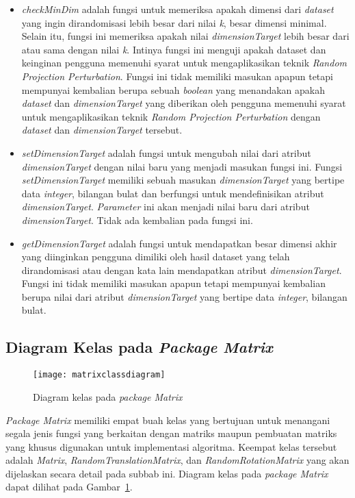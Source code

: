 \begin{itemize}
	\item \textit{checkMinDim} adalah fungsi untuk memeriksa apakah dimensi dari \textit{dataset} yang ingin dirandomisasi lebih besar dari nilai \textit{k}, besar dimensi minimal. Selain itu, fungsi ini memeriksa apakah nilai \textit{dimensionTarget} lebih besar dari atau sama dengan nilai \textit{k}. Intinya fungsi ini menguji apakah dataset dan keinginan pengguna memenuhi syarat untuk mengaplikasikan teknik \textit{Random Projection Perturbation}. Fungsi ini tidak memiliki masukan apapun tetapi mempunyai kembalian berupa sebuah \textit{boolean} yang menandakan apakah \textit{dataset} dan \textit{dimensionTarget} yang diberikan oleh pengguna memenuhi syarat untuk mengaplikasikan teknik \textit{Random Projection Perturbation} dengan \textit{dataset} dan \textit{dimensionTarget} tersebut.
	\item \textit{setDimensionTarget} adalah fungsi untuk mengubah nilai dari atribut \textit{dimensionTarget} dengan nilai baru yang menjadi masukan fungsi ini. Fungsi \textit{setDimensionTarget} memiliki sebuah masukan \textit{dimensionTarget} yang bertipe data \textit{integer}, bilangan bulat dan berfungsi untuk mendefinisikan atribut \textit{dimensionTarget}. \textit{Parameter} ini akan menjadi nilai baru dari atribut \textit{dimensionTarget}. Tidak ada kembalian pada fungsi ini.
	\item \textit{getDimensionTarget} adalah fungsi untuk mendapatkan besar dimensi akhir yang diinginkan pengguna dimiliki oleh hasil dataset yang telah dirandomisasi atau dengan kata lain mendapatkan atribut \textit{dimensionTarget}. Fungsi ini tidak memiliki masukan apapun tetapi mempunyai kembalian berupa nilai dari atribut \textit{dimensionTarget} yang bertipe data \textit{integer}, bilangan bulat.
\end{itemize}

\subsection{Diagram Kelas pada \textit{Package Matrix}}
\label{sec:diagram-kelas-matrix}

\begin{figure}
	\centering
	\texttt{[image: matrixclassdiagram]}
	\caption{Diagram kelas pada \textit{package Matrix}}
	\label{fig:matrixclassdiagram}
\end{figure}

\textit{Package Matrix} memiliki empat buah kelas yang bertujuan untuk menangani segala jenis fungsi yang berkaitan dengan matriks maupun pembuatan matriks yang khusus digunakan untuk implementasi algoritma. Keempat kelas tersebut adalah \textit{Matrix}, \textit{RandomTranslationMatrix}, dan \textit{RandomRotationMatrix} yang akan dijelaskan secara detail pada subbab ini. Diagram kelas pada \textit{package Matrix} dapat dilihat pada Gambar~\ref{fig:matrixclassdiagram}.


